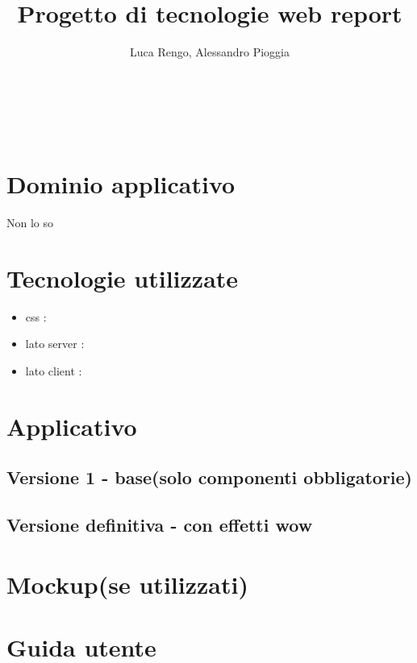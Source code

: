 \documentclass[a4paper,12pt]{report}
\title{\textbf{Progetto di tecnologie web report}}
\author{Luca Rengo, Alessandro Pioggia}
\begin{document}
	
	\makeatletter
	\begin{titlepage}
		\begin{center}
			{\Huge  \@title }\\[3ex] 
			{\large  \@author}\\[3ex] 
			{\large \@date}
		\end{center}
	\end{titlepage}
	\makeatother
	\thispagestyle{empty}
	\newpage
	
	
	\tableofcontents

	\newpage
	
	
	\section{Dominio applicativo}
	Non lo so
	\section{Tecnologie utilizzate}
	\begin{itemize}
		\item css : 
		\item lato server : 
		\item lato client : 
	\end{itemize}
	\section{Applicativo}
	\subsection{Versione 1 - base(solo componenti obbligatorie)}
	\subsection{Versione definitiva - con effetti wow}
	\section{Mockup(se utilizzati)}
	\section{Guida utente}
\end{document}
